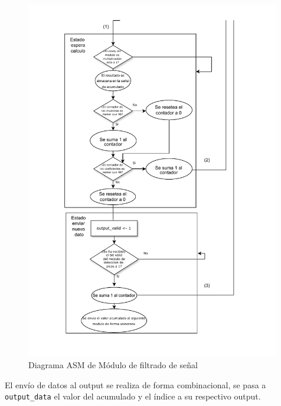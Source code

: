 \begin{figure}[h!]
    \centering
    \includegraphics[width=0.99\textwidth]{./Images/img_implementacion_hw/Diagramaasmfiltrado2.pdf}
    \caption{Diagrama ASM de Módulo de filtrado de señal}
    \label{fig:Diagramaasmfiltrado2}
\end{figure} 
\FloatBarrier
El envío de datos al output se realiza de forma combinacional, se pasa a \texttt{output\_data} el 
valor del acumulado y el índice a su respectivo output.
